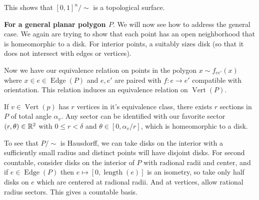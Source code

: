 \documentclass[a4paper]{scrartcl}
\begin{document}
\begin{example}
\begin{center}
\end{center}


This shows that $[0, 1]^n / \sim$ is a topological surface.

\textbf{For a general planar polygon $P$}. We will now see how to address the general case.
We again are trying to show that each point has an open neighborhood that is homeomorphic to a disk. For interior points, a suitably sizes disk (so that it does not intersect with edges or vertices).

Now we have our equivalence relation on points in the polygon $x \sim f_{ee'}(x)$ where $x \in e \in \operatorname{Edge}(P)$ and $e, e'$ are paired with $f: e \rightarrow e'$ compatible with orientation. This relation induces an equivalence relation on $\operatorname{Vert}(P)$.

If $v \in \operatorname{Vert}(p)$ has $r$ vertices in it's equivalence class, there exists $r$ sections in $P$ of total angle $\alpha_v$. Any sector can be identified with our favorite sector $(r, \theta) \in \mathbb{R}^2$ with $0 \leq r < \delta$ and $\theta \in [0, \alpha_v/r]$, which is homeomorphic to a disk.

To see that $P/\sim$ is Hausdorff, we can take disks on the interior with a sufficiently small radius and distinct points will have disjoint disks. For second countable, consider disks on the interior of $P$ with radional radii and center, and if $e \in \operatorname{Edge}(P)$ then $e \mapsto [0, \operatorname{length}(e)]$ is an isometry, so take only half disks on $e$ which are centered at radional radii. And at vertices, allow rational radius sectors. This gives a countable basis.


\end{example}
\end{document}
